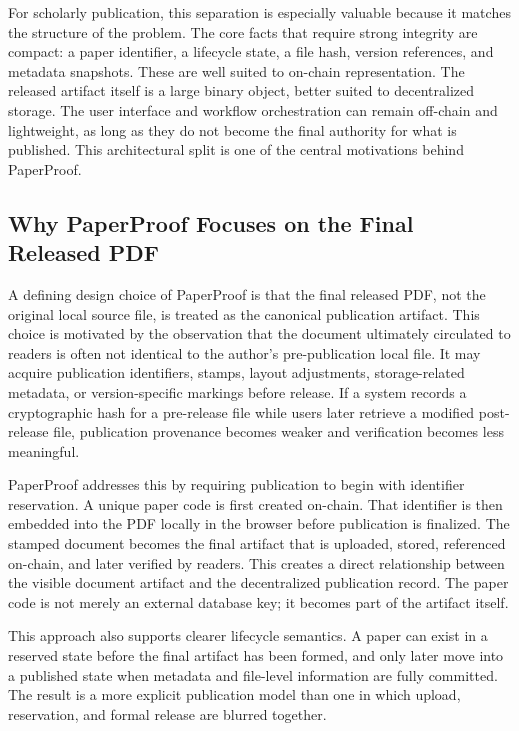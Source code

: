 \documentclass[journal]{IEEEtran}
\begin{document}
For scholarly publication, this separation is especially valuable because it matches the structure of the problem. The core facts that require strong integrity are compact: a paper identifier, a lifecycle state, a file hash, version references, and metadata snapshots. These are well suited to on-chain representation. The released artifact itself is a large binary object, better suited to decentralized storage. The user interface and workflow orchestration can remain off-chain and lightweight, as long as they do not become the final authority for what is published. This architectural split is one of the central motivations behind PaperProof.

\subsection{Why PaperProof Focuses on the Final Released PDF}

A defining design choice of PaperProof is that the final released PDF, not the original local source file, is treated as the canonical publication artifact. This choice is motivated by the observation that the document ultimately circulated to readers is often not identical to the author's pre-publication local file. It may acquire publication identifiers, stamps, layout adjustments, storage-related metadata, or version-specific markings before release. If a system records a cryptographic hash for a pre-release file while users later retrieve a modified post-release file, publication provenance becomes weaker and verification becomes less meaningful.

PaperProof addresses this by requiring publication to begin with identifier reservation. A unique paper code is first created on-chain. That identifier is then embedded into the PDF locally in the browser before publication is finalized. The stamped document becomes the final artifact that is uploaded, stored, referenced on-chain, and later verified by readers. This creates a direct relationship between the visible document artifact and the decentralized publication record. The paper code is not merely an external database key; it becomes part of the artifact itself.

This approach also supports clearer lifecycle semantics. A paper can exist in a reserved state before the final artifact has been formed, and only later move into a published state when metadata and file-level information are fully committed. The result is a more explicit publication model than one in which upload, reservation, and formal release are blurred together.
\end{document}
